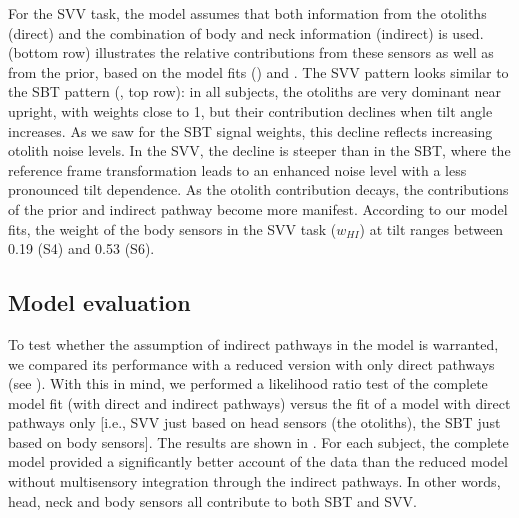 For the SVV task, the model assumes that both information from the otoliths (direct) and the combination of body and neck information (indirect) is used.  (bottom row) illustrates the relative contributions from these sensors as well as from the prior, based on the model fits () and . The SVV pattern looks similar to the SBT pattern (, top row): in all subjects, the otoliths are very dominant near upright, with weights close to 1, but their contribution declines when tilt angle increases. As we saw for the SBT signal weights, this decline reflects increasing otolith noise levels. In the SVV, the decline is steeper than in the SBT, where the reference frame transformation leads to an enhanced noise level with a less pronounced tilt dependence. As the otolith contribution decays, the contributions of the prior and indirect pathway become more manifest. According to our model fits, the weight of the body sensors in the SVV task ($w_{HI}$) at  tilt ranges between 0.19 (S4) and 0.53 (S6).

\subsection{Model evaluation}

To test whether the assumption of indirect pathways in the model is warranted, we compared its performance with a reduced version with only direct pathways (see ). With this in mind, we performed a likelihood ratio test of the complete model fit (with direct and indirect pathways) versus the fit of a model with direct pathways only [i.e., SVV just based on head sensors (the otoliths), the SBT just based on body sensors]. The results are shown in . For each subject, the complete model provided a significantly better account of the data than the reduced model without multisensory integration through the indirect pathways. In other words, head, neck and body sensors all contribute to both SBT and SVV.

